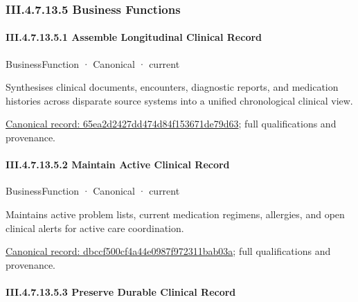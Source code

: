 \subsubsection*{III.4.7.13.5 Business Functions}
\label{navigation:III.4.7.13.5}

\paragraph*{III.4.7.13.5.1 Assemble Longitudinal Clinical Record}
\label{navigation:III.4.7.13.5.1}

\label{element:65ea2d2427dd474d84f153671de79d63}
{\small BusinessFunction · Canonical · current}\par

Synthesises clinical documents, encounters, diagnostic reports, and medication histories across disparate source systems into a unified chronological clinical view.


{\footnotesize \href{../../../../../../../continuum/business/business-function/65ea2d2427dd474d84f153671de79d63.md}{Canonical record: 65ea2d2427dd474d84f153671de79d63}; full qualifications and provenance.}\par
\paragraph*{III.4.7.13.5.2 Maintain Active Clinical Record}
\label{navigation:III.4.7.13.5.2}

\label{element:dbccf500cf4a44e0987f972311bab03a}
{\small BusinessFunction · Canonical · current}\par

Maintains active problem lists, current medication regimens, allergies, and open clinical alerts for active care coordination.


{\footnotesize \href{../../../../../../../continuum/business/business-function/dbccf500cf4a44e0987f972311bab03a.md}{Canonical record: dbccf500cf4a44e0987f972311bab03a}; full qualifications and provenance.}\par
\paragraph*{III.4.7.13.5.3 Preserve Durable Clinical Record}
\label{navigation:III.4.7.13.5.3}

